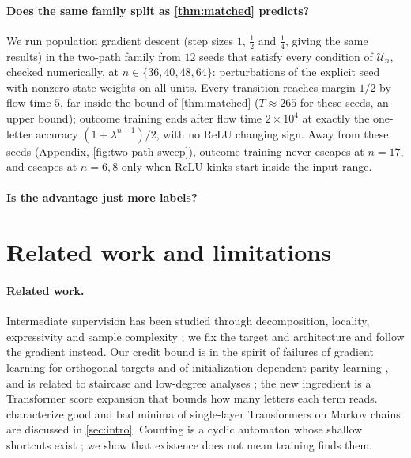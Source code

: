 \paragraph{Does the same family split as \cref{thm:matched} predicts?} We run population gradient descent (step sizes $1$, $\tfrac12$ and $\tfrac14$, giving the same results) in
the two-path family from $12$ seeds that satisfy every condition of $\mathcal U_n$, checked numerically, at
$n\in\{36,40,48,64\}$: perturbations of the explicit seed with nonzero state weights on all units. Every transition
reaches margin $1/2$ by flow time $5$, far inside the bound of \cref{thm:matched} ($T\approx265$ for these seeds, an upper bound); outcome training ends after flow time $2\times10^4$ at
exactly the one-letter accuracy $(1+\lambda^{n-1})/2$, with no ReLU changing sign. Away from these seeds
(Appendix, \cref{fig:two-path-sweep}), outcome training never escapes at $n=17$, and escapes at $n=6,8$ only when
ReLU kinks start inside the input range.

\paragraph{Is the advantage just more labels?} 

\section{Related work and limitations}
\label{sec:related}
\label{sec:conclusion}

\paragraph{Related work.} Intermediate supervision has been studied through decomposition, locality,
expressivity and sample complexity
\citep{wies2023subtask,prystawski2023think,abbe2024globality,feng2023towards,merrill2024expressive,malach2023autoregressive,hanneke2026samplecomplexityautoregressivereasoning,wen2024sparse};
we fix the target and architecture and follow the gradient instead. Our credit bound is in the spirit of
failures of gradient learning for orthogonal targets \citep{shalevshwartz2017failures} and of
initialization-dependent parity learning \citep{abbe2025parities}, and is related to staircase and low-degree
analyses \citep{abbe2021staircase,abbe2023sgd,panigrahi2025progressive}; the new ingredient is a Transformer score
expansion that bounds how many letters each term reads. \citet{makkuva2025attention,makkuva2024local}
characterize good and bad minima of single-layer Transformers on Markov chains.  are
discussed in \cref{sec:intro}. Counting is a cyclic automaton whose shallow shortcuts exist
\citep{liu2023automata}; we show that existence does not mean training finds them.

